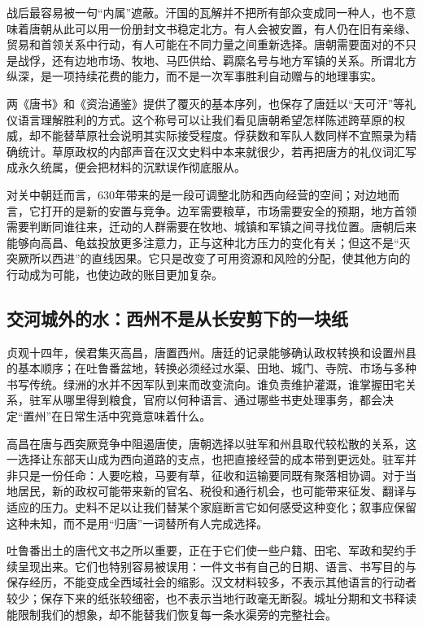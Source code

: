 战后最容易被一句“内属”遮蔽。汗国的瓦解并不把所有部众变成同一种人，也不意味着唐朝从此可以用一份册封文书稳定北方。有人会被安置，有人仍在旧有亲缘、贸易和首领关系中行动，有人可能在不同力量之间重新选择。唐朝需要面对的不只是战俘，还有边地市场、牧地、马匹供给、羁縻名号与地方军镇的关系。所谓北方纵深，是一项持续花费的能力，而不是一次军事胜利自动赠与的地理事实。

两《唐书》和《资治通鉴》提供了覆灭的基本序列，也保存了唐廷以“天可汗”等礼仪语言理解胜利的方式。这个称号可以让我们看见唐朝希望怎样陈述跨草原的权威，却不能替草原社会说明其实际接受程度。俘获数和军队人数同样不宜照录为精确统计。草原政权的内部声音在汉文史料中本来就很少，若再把唐方的礼仪词汇写成永久统属，便会把材料的沉默误作彻底服从。

对关中朝廷而言，630年带来的是一段可调整北防和西向经营的空间；对边地而言，它打开的是新的安置与竞争。边军需要粮草，市场需要安全的预期，地方首领需要判断同谁往来，迁动的人群需要在牧地、城镇和军镇之间寻找位置。唐朝后来能够向高昌、龟兹投放更多注意力，正与这种北方压力的变化有关；但这不是“灭突厥所以西进”的直线因果。它只是改变了可用资源和风险的分配，使其他方向的行动成为可能，也使边政的账目更加复杂。

\subsection{交河城外的水：西州不是从长安剪下的一块纸}
贞观十四年，侯君集灭高昌，唐置西州。唐廷的记录能够确认政权转换和设置州县的基本顺序；在吐鲁番盆地，转换必须经过水渠、田地、城门、寺院、市场与多种书写传统。绿洲的水并不因军队到来而改变流向。谁负责维护灌溉，谁掌握田宅关系，驻军从哪里得到粮食，官府以何种语言、通过哪些书吏处理事务，都会决定“置州”在日常生活中究竟意味着什么。

高昌在唐与西突厥竞争中阻遏唐使，唐朝选择以驻军和州县取代较松散的关系，这一选择让东部天山成为西向道路的支点，也把直接经营的成本带到更远处。驻军并非只是一份任命：人要吃粮，马要有草，征收和运输要同既有聚落相协调。对于当地居民，新的政权可能带来新的官名、税役和通行机会，也可能带来征发、翻译与适应的压力。史料不足以让我们替某个家庭断言它如何感受这种变化；叙事应保留这种未知，而不是用“归唐”一词替所有人完成选择。

吐鲁番出土的唐代文书之所以重要，正在于它们使一些户籍、田宅、军政和契约手续呈现出来。它们也特别容易被误用：一件文书有自己的日期、语言、书写目的与保存经历，不能变成全西域社会的缩影。汉文材料较多，不表示其他语言的行动者较少；保存下来的纸张较细密，也不表示当地行政毫无断裂。城址分期和文书释读能限制我们的想象，却不能替我们恢复每一条水渠旁的完整社会。

